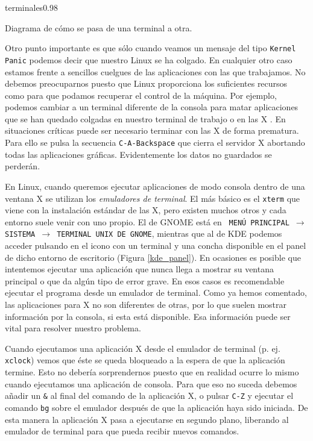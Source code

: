 \begin{figura}{terminales}{0.98}
\caption{Diagrama de cómo se pasa de una terminal a otra.}
\label{terminales}
\end{figura}

Otro punto  importante es que sólo  cuando veamos un mensaje  del tipo
{\tt Kernel Panic}  podemos decir que nuestro Linux se  ha colgado. En
cualquier  otro  caso  estamos  frente a  sencillos  cuelgues  de  las
aplicaciones con  las que  trabajamos. No debemos  preocuparnos puesto
que Linux proporciona  los suficientes recursos como  para que podamos
recuperar el control de la máquina.  Por ejemplo, podemos cambiar a un
terminal diferente  de la consola  para matar aplicaciones que  se han
quedado colgadas en nuestro terminal de trabajo  o en las {\sf X} . En
situaciones críticas puede  ser necesario terminar con las  {\sf X} de
forma prematura. Para  ello se pulsa la  secuencia {\tt C-A-Backspace}
que  cierra  el servidor  {\sf  X}  abortando todas  las  aplicaciones
gráficas. Evidentemente los datos no guardados se perderán.

En Linux, cuando queremos ejecutar aplicaciones de modo consola dentro
de una ventana {\sf X} se utilizan los {\em emuladores de terminal}.
El más básico es el {\tt xterm} que viene con la
instalación estándar de las {\sf X}, pero existen muchos otros y cada
entorno suele venir con uno propio. El de {\sf GNOME} está en {\tt
MENÚ PRINCIPAL $\rightarrow$ SISTEMA $\rightarrow$ TERMINAL UNIX DE
GNOME}, mientras que al de {\sf KDE} podemos acceder pulsando en el
icono con un terminal y una concha disponible en el panel de dicho
entorno de escritorio (Figura \ref{kde_panel}).  En ocasiones es
posible que intentemos ejecutar una aplicación que nunca llega a
mostrar su ventana principal o que da algún tipo de error grave. En
esos casos es recomendable ejecutar el programa desde un emulador de
terminal. Como ya hemos comentado, las aplicaciones para {\sf X} no
son diferentes de otras, por lo que suelen mostrar información por la
consola, si esta está disponible.  Esa información puede ser vital
para resolver nuestro problema.

Cuando ejecutamos una aplicación {\sf X} desde el emulador de terminal
(p. ej. {\tt xclock}) vemos que éste se queda bloqueado a la espera de
que la aplicación termine. Esto no debería sorprendernos puesto que en
realidad ocurre lo mismo cuando  ejecutamos una aplicación de consola.
Para que eso no suceda debemos añadir un {\tt \&} al final del comando
de la  aplicación {\sf X},  o pulsar {\tt  C-Z} y ejecutar  el comando
{\tt bg} sobre el emulador después de que la aplicación haya
sido iniciada. De esta manera la  aplicación {\sf X} pasa a ejecutarse
en segundo  plano, liberando  al emulador de  terminal para  que pueda
recibir nuevos comandos.

